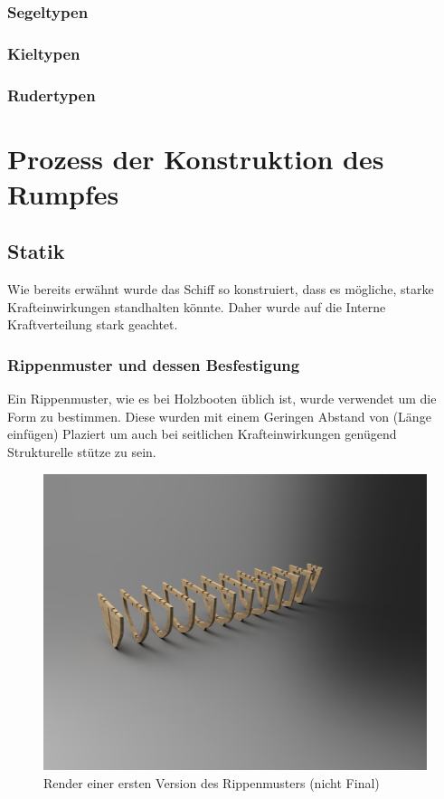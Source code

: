 \subsubsection{Segeltypen}

\subsubsection{Kieltypen}

\subsubsection{Rudertypen}

\section{Prozess der Konstruktion des Rumpfes}
\subsection{Statik}
Wie bereits erwähnt wurde das Schiff so konstruiert, dass es mögliche, starke Krafteinwirkungen standhalten könnte. Daher wurde auf die Interne Kraftverteilung stark geachtet.
\subsubsection{Rippenmuster und dessen Besfestigung}
Ein Rippenmuster, wie es bei Holzbooten üblich ist, wurde verwendet um die Form zu bestimmen. Diese wurden mit einem Geringen Abstand von (Länge einfügen) Plaziert um auch bei seitlichen Krafteinwirkungen genügend Strukturelle stütze zu sein.

\begin{figure}[H]
  \centering
  \includegraphics[width=\textwidth]{assets/rippenv1.png}
  \caption{Render einer ersten Version des Rippenmusters (nicht Final) }
  \label{fig:rippenv1}
\end{figure}


